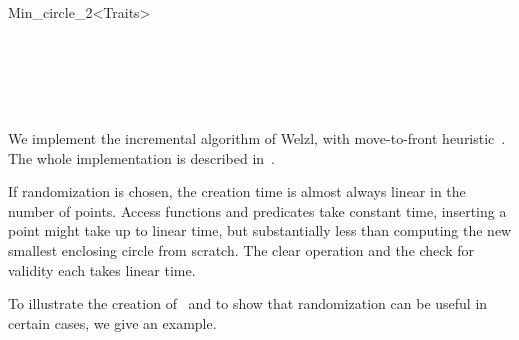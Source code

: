 \begin{ccRefClass}{Min_circle_2<Traits>}
\begin{ccIndexGlobalFunctions}



\end{ccIndexGlobalFunctions}

\ccSeeAlso

\\
\\[1ex]
\\[1ex]
\\[1ex]

\ccImplementation
\ccIndexImplementation

We implement the incremental algorithm of Welzl, with move-to-front
heuristic~\cite{w-sedbe-91a}. The whole implementation is described
in~\cite{cgal:gs-seceg-98}.

If randomization is
chosen, the creation time is almost always linear in the number of points.
Access functions and predicates take constant time, inserting a point might
take up to linear time, but substantially less than computing the new
smallest enclosing circle from scratch. The clear operation and the check
for validity each takes linear time.

\ccExample
{}

To illustrate the creation of \ccRefName\ and to show that
randomization can be useful in certain cases, we give an example.



\ccRestoreThreeColumns

\end{ccRefClass}


